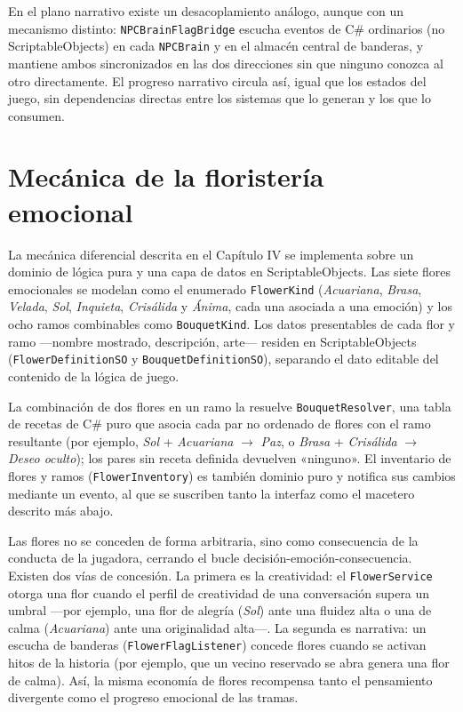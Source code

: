 \documentclass[12pt,twoside,titlepage]{report}
\begin{document}
En el plano narrativo existe un desacoplamiento análogo, aunque con un mecanismo distinto: \texttt{NPCBrainFlagBridge} escucha eventos de C\# ordinarios (no ScriptableObjects) en cada \texttt{NPCBrain} y en el almacén central de banderas, y mantiene ambos sincronizados en las dos direcciones sin que ninguno conozca al otro directamente. El progreso narrativo circula así, igual que los estados del juego, sin dependencias directas entre los sistemas que lo generan y los que lo consumen.

\section{Mecánica de la floristería emocional}

La mecánica diferencial descrita en el Capítulo IV se implementa sobre un dominio de lógica pura y una capa de datos en ScriptableObjects. Las siete flores emocionales se modelan como el enumerado \texttt{FlowerKind} (\textit{Acuariana}, \textit{Brasa}, \textit{Velada}, \textit{Sol}, \textit{Inquieta}, \textit{Crisálida} y \textit{Ánima}, cada una asociada a una emoción) y los ocho ramos combinables como \texttt{BouquetKind}. Los datos presentables de cada flor y ramo ---nombre mostrado, descripción, arte--- residen en ScriptableObjects (\texttt{FlowerDefinitionSO} y \texttt{BouquetDefinitionSO}), separando el dato editable del contenido de la lógica de juego.

La combinación de dos flores en un ramo la resuelve \texttt{BouquetResolver}, una tabla de recetas de C\# puro que asocia cada par no ordenado de flores con el ramo resultante (por ejemplo, \textit{Sol} + \textit{Acuariana} $\rightarrow$ \textit{Paz}, o \textit{Brasa} + \textit{Crisálida} $\rightarrow$ \textit{Deseo oculto}); los pares sin receta definida devuelven «ninguno». El inventario de flores y ramos (\texttt{FlowerInventory}) es también dominio puro y notifica sus cambios mediante un evento, al que se suscriben tanto la interfaz como el macetero descrito más abajo.

Las flores no se conceden de forma arbitraria, sino como consecuencia de la conducta de la jugadora, cerrando el bucle decisión-emoción-consecuencia. Existen dos vías de concesión. La primera es la creatividad: el \texttt{FlowerService} otorga una flor cuando el perfil de creatividad de una conversación supera un umbral ---por ejemplo, una flor de alegría (\textit{Sol}) ante una fluidez alta o una de calma (\textit{Acuariana}) ante una originalidad alta---. La segunda es narrativa: un escucha de banderas (\texttt{FlowerFlagListener}) concede flores cuando se activan hitos de la historia (por ejemplo, que un vecino reservado se abra genera una flor de calma). Así, la misma economía de flores recompensa tanto el pensamiento divergente como el progreso emocional de las tramas.
\end{document}
